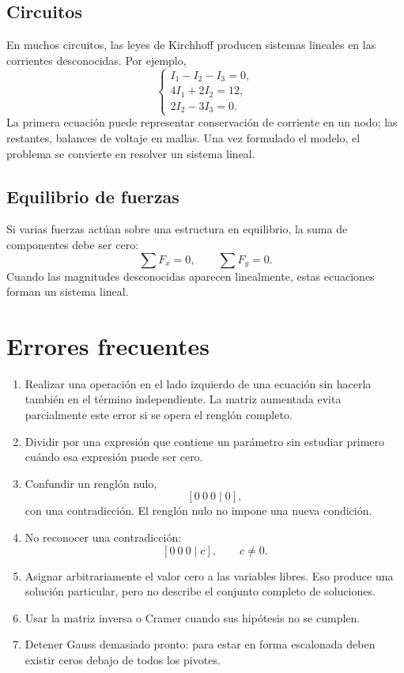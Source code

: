 \documentclass[12pt]{article}
\theoremstyle{remark}
\begin{document}
\subsection{Circuitos}

En muchos circuitos, las leyes de Kirchhoff producen sistemas lineales en las corrientes desconocidas.
Por ejemplo,
\[
\begin{cases}
I_1-I_2-I_3=0,\\
4I_1+2I_2=12,\\
2I_2-3I_3=0.
\end{cases}
\]
La primera ecuación puede representar conservación de corriente en un nodo; las restantes, balances de
voltaje en mallas. Una vez formulado el modelo, el problema se convierte en resolver un sistema lineal.

\subsection{Equilibrio de fuerzas}

Si varias fuerzas actúan sobre una estructura en equilibrio, la suma de componentes debe ser cero:
\[
\sum F_x=0,\qquad \sum F_y=0.
\]
Cuando las magnitudes desconocidas aparecen linealmente, estas ecuaciones forman un sistema lineal.

\section{Errores frecuentes}

\begin{enumerate}
\item Realizar una operación en el lado izquierdo de una ecuación sin hacerla también en el término
independiente. La matriz aumentada evita parcialmente este error si se opera el renglón completo.
\item Dividir por una expresión que contiene un parámetro sin estudiar primero cuándo esa expresión
puede ser cero.
\item Confundir un renglón nulo,
\[
[0\ 0\ 0\mid0],
\]
con una contradicción. El renglón nulo no impone una nueva condición.
\item No reconocer una contradicción:
\[
[0\ 0\ 0\mid c],\qquad c\neq0.
\]
\item Asignar arbitrariamente el valor cero a las variables libres. Eso produce una solución particular,
pero no describe el conjunto completo de soluciones.
\item Usar la matriz inversa o Cramer cuando sus hipótesis no se cumplen.
\item Detener Gauss demasiado pronto: para estar en forma escalonada deben existir ceros debajo de
todos los pivotes.
\end{enumerate}
\end{document}
